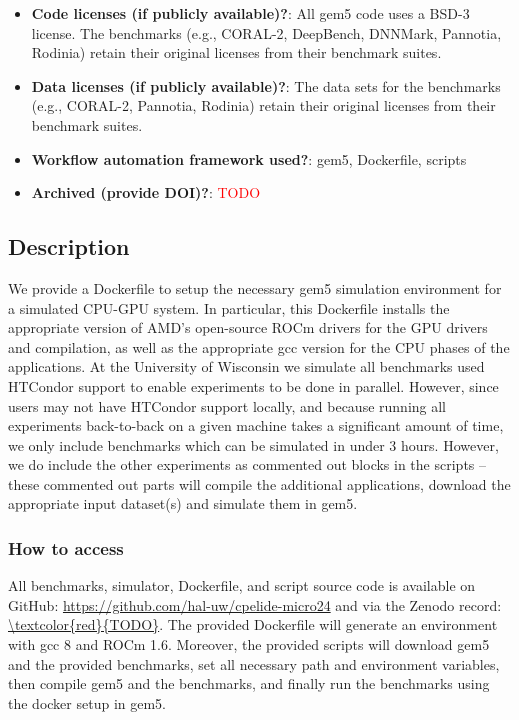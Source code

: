 \documentclass{sigplanconf}
\begin{document}
{\begin{itemize}
  \item {\bf Code licenses (if publicly available)?}: All gem5 code uses a BSD-3 license.  The benchmarks (e.g., CORAL-2, DeepBench, DNNMark, Pannotia, Rodinia) retain their original licenses from their benchmark suites.
  \item {\bf Data licenses (if publicly available)?}: The data sets for the benchmarks (e.g., CORAL-2, Pannotia, Rodinia) retain their original licenses from their benchmark suites.
  \item {\bf Workflow automation framework used?}: gem5, Dockerfile, scripts
  \item {\bf Archived (provide DOI)?}: \textcolor{red}{TODO}
\end{itemize}
}

\subsection{Description}
\label{subsec:artifact-descrip}

We provide a Dockerfile to setup the necessary gem5 simulation environment for a simulated CPU-GPU system. 
In particular, this Dockerfile installs the appropriate version of AMD's open-source ROCm drivers for the GPU drivers and compilation, as well as the appropriate gcc version for the CPU phases of the applications.
At the University of Wisconsin we simulate all benchmarks used HTCondor support to enable experiments to be done in parallel.
However, since users may not have HTCondor support locally, and because running all experiments back-to-back on a given machine takes a significant amount of time, we only include benchmarks which can be simulated in under 3 hours.
However, we do include the other experiments as commented out blocks in the scripts -- these commented out parts will compile the additional applications, download the appropriate input dataset(s) and simulate them in gem5.

\subsubsection{How to access}
\label{subsubsec:artifact-descrip-access}


All benchmarks, simulator, Dockerfile, and script source code is available on GitHub: \url{https://github.com/hal-uw/cpelide-micro24}  and via the Zenodo record: \url{\textcolor{red}{TODO}}.
The provided Dockerfile will generate an environment with gcc 8 and ROCm 1.6.
Moreover, the provided scripts will download gem5 and the provided benchmarks, set all necessary path and environment variables, then compile gem5 and the benchmarks, and finally run the benchmarks using the docker setup in gem5.
\end{document}
